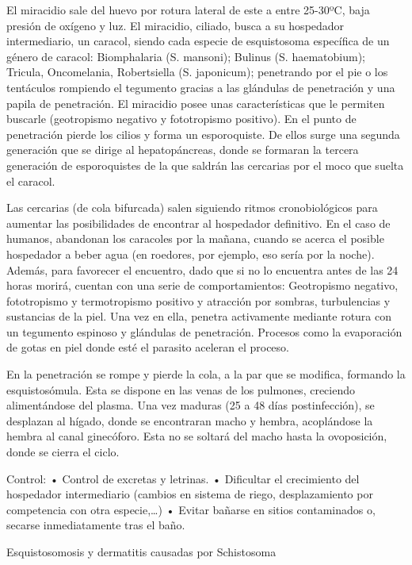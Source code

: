 El miracidio sale del huevo por rotura lateral de este a entre 25-30ºC, baja presión de oxígeno y luz. El miracidio, ciliado, busca a su hospedador intermediario, un caracol, siendo cada especie de esquistosoma específica de un género de caracol: Biomphalaria (S. mansoni); Bulinus (S. haematobium); Tricula, Oncomelania, Robertsiella (S. japonicum); penetrando por el pie o los tentáculos rompiendo el tegumento gracias a las glándulas de penetración y una papila de penetración. El miracidio posee unas características que le permiten buscarle (geotropismo negativo y fototropismo positivo). En el punto de penetración pierde los cilios y forma un esporoquiste. De ellos surge una segunda generación que se dirige al hepatopáncreas, donde se formaran la tercera generación de esporoquistes de la que saldrán las cercarias por el moco que suelta el caracol.

Las cercarias (de cola bifurcada) salen siguiendo ritmos cronobiológicos para aumentar las posibilidades de encontrar al hospedador definitivo. En el caso de humanos, abandonan los caracoles por la mañana, cuando se acerca el posible hospedador a beber agua (en roedores, por ejemplo, eso sería por la noche). Además, para favorecer el encuentro, dado que si no lo encuentra antes de las 24 horas morirá, cuentan con una serie de comportamientos: Geotropismo negativo, fototropismo y termotropismo positivo y atracción por sombras, turbulencias y sustancias de la piel. Una vez en ella, penetra activamente mediante rotura con un tegumento espinoso y glándulas de penetración. Procesos como la evaporación de gotas en piel donde esté el parasito aceleran el proceso.

En la penetración se rompe y pierde la cola, a la par que se modifica, formando la esquistosómula. Esta se dispone en las venas de los pulmones, creciendo alimentándose del plasma. Una vez maduras (25 a 48 días postinfección), se desplazan al hígado, donde se encontraran macho y hembra, acoplándose la hembra al canal ginecóforo. Esta no se soltará del macho hasta la ovoposición, donde se cierra el ciclo.

Control:
• Control de excretas y letrinas.
• Dificultar el crecimiento del hospedador intermediario (cambios en sistema de riego, desplazamiento por competencia con otra especie,…)
• Evitar bañarse en sitios contaminados o, secarse inmediatamente tras el baño.





Esquistosomosis y dermatitis causadas por Schistosoma

